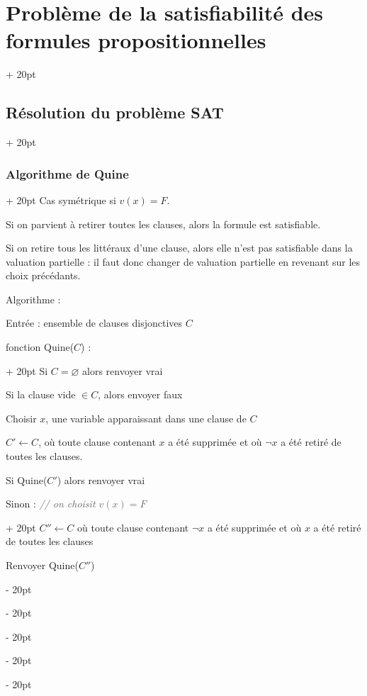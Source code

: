 \documentclass[a4paper, 12pt, twoside]{article}
\newcommand{\ind}[1][20pt]{\advance\leftskip + #1}
\newcommand{\deind}[1][20pt]{\advance\leftskip - #1}
\newenvironment{indt}[2][20pt]{#2 \par \ind[#1]}{\par \deind} %
\begin{document}
\begin{indt}{\section{Problème de la satisfiabilité des formules propositionnelles}}
\begin{indt}{\subsection{Résolution du problème SAT}}
\begin{indt}{\subsubsection{Algorithme de Quine}}
                Cas symétrique si $v(x) = F$.
                
                Si on parvient à retirer toutes les clauses, alors la formule est satisfiable.
                
                Si on retire tous les littéraux d'une clause, alors elle n'est pas satisfiable dans la valuation partielle : il faut donc changer de valuation partielle en revenant sur les choix précédants.
                
                \vspace{12pt}
                
                Algorithme :
                
                Entrée : ensemble de clauses disjonctives $C$
                
                \begin{pseudocode}
                    \begin{indt}{fonction Quine($C$) :}
                        Si $C = \varnothing$ alors renvoyer vrai
                        
                        Si la clause vide $\in C$, alors envoyer faux
                        
                        \vspace{6pt}
                        
                        Choisir $x$, une variable apparaissant dans une clause de $C$
                        
                        $C' \leftarrow C$, où toute clause contenant $x$ a été supprimée et où $\neg x$  a été retiré de toutes les clauses.
                        
                        \vspace{6pt}
                        
                        Si Quine($C'$) alors renvoyer vrai
                        
                        \begin{indt}{Sinon : \textcolor{656565}{\it // on choisit $v(x) = F$}}
                            $C'' \leftarrow C$ où toute clause contenant $\neg x$ a été supprimée et où $x$ a été retiré de toutes les clauses
                            
                            Renvoyer Quine($C''$)
                        \end{indt}
                    \end{indt}
                \end{pseudocode}
                

\end{indt}
\end{indt}
\end{indt}
\end{document}
